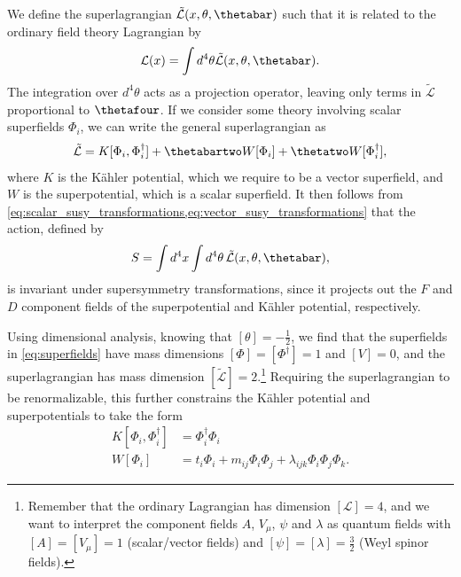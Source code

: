 We define the superlagrangian $\tilde{\mathcal{L}}(x,\theta,\thetabar)$ such that it is related to the ordinary field theory Lagrangian by
\begin{equation}\label{eq:superlagrangian}
    \mathcal{L}(x) = \int d^4\theta \tilde{\mathcal{L}}(x,\theta,\thetabar).
\end{equation}
The integration over $d^4\theta$ acts as a projection operator, leaving only terms in $\tilde{\mathcal{L}}$ proportional to $\thetafour$.
If we consider some theory involving scalar superfields $\Phi_i$, we can write the general superlagrangian as
\begin{equation}
    \tilde{\mathcal{L}} = K[\Phi_i,\Phi_i^\dagger] + \thetabartwo W[\Phi_i] + \thetatwo W[\Phi_i^\dagger],
\end{equation}
where $K$ is the K\"ahler potential, which we require to be a vector superfield, and $W$ is the superpotential, which is a scalar superfield.
It then follows from \cref{eq:scalar_susy_transformations,eq:vector_susy_transformations} that the action, defined by
\begin{equation}
    S = \int d^4x \int d^4\theta \, \tilde{\mathcal{L}}(x,\theta,\thetabar),
\end{equation}
is invariant under supersymmetry transformations, since it projects out the $F$ and $D$ component fields of the superpotential and K\"ahler potential, respectively.

Using dimensional analysis, knowing that $[\theta]=-\frac{1}{2}$, we find that the superfields in \cref{eq:superfields} have mass dimensions $[\Phi]=[\Phi^\dagger]=1$ and $[V]=0$, and the superlagrangian has mass dimension $[\tilde{\mathcal{L}}]=2$.\footnote{Remember that the ordinary Lagrangian has dimension $[\mathcal{L}]=4$, and we want to interpret the component fields $A$, $V_\mu$, $\psi$ and $\lambda$ as quantum fields with $[A]=[V_\mu]=1$ (scalar/vector fields) and $[\psi]=[\lambda]=\frac{3}{2}$ (Weyl spinor fields).}
Requiring the superlagrangian to be renormalizable, this further constrains the K\"ahler potential and superpotentials to take the form
\begin{subequations}
\begin{align}
    K[\Phi_i,\Phi_i^\dagger] &= \Phi_i^\dagger\Phi_i
    \\
    W[\Phi_i] &= t_i \Phi_i + m_{ij} \Phi_i\Phi_j + \lambda_{ijk} \Phi_i\Phi_j\Phi_k.
\end{align}
\end{subequations}

